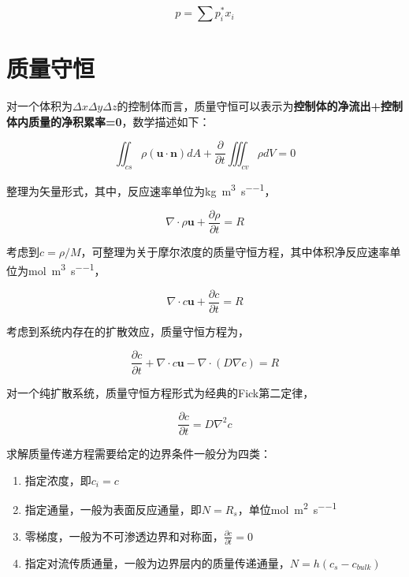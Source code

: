 \begin{equation}
p = \sum p_i^* x_i
\end{equation}


\section{质量守恒}

对一个体积为$ \Delta x \Delta y \Delta z $的控制体而言，质量守恒可以表示为\textbf{控制体的净流出+控制体内质量的净积累率=0}，数学描述如下：

\begin{equation}
\iint_{cs} \rho(\bm{u\cdot n})dA + \frac{\partial }{\partial t} \iiint_{cv}\rho dV = 0
\end{equation}

整理为矢量形式，其中，反应速率单位为\si{\kg\per\meter\cubed\per\second}，

\begin{equation}
\nabla \cdot \rho\mathbf{u} + \frac{\partial \rho}{\partial t} = R
\end{equation}

考虑到$ c=\rho/M $，可整理为关于摩尔浓度的质量守恒方程，其中体积净反应速率单位为\si{\mole\per\meter\cubed\per\second}，

\begin{equation}
\nabla \cdot c\mathbf{u} + \frac{\partial c}{\partial t} = R
\end{equation}

考虑到系统内存在的扩散效应，质量守恒方程为，

\begin{equation}
\frac{\partial c}{\partial t} + \nabla \cdot c\mathbf{u} - \nabla\cdot(D\nabla c) = R
\end{equation}

对一个纯扩散系统，质量守恒方程形式为经典的Fick第二定律，

\begin{equation}
\frac{\partial c}{\partial t} = D\nabla^2 c
\end{equation}

求解质量传递方程需要给定的边界条件一般分为四类：

\begin{enumerate}
\item 指定浓度，即$ c_i = c $
\item 指定通量，一般为表面反应通量，即$ N=R_s $，单位\si{\mole\per\meter\squared\per\second}
\item 零梯度，一般为不可渗透边界和对称面，$ \frac{\partial c}{\partial t}=0 $
\item 指定对流传质通量，一般为边界层内的质量传递通量，$ N=h(c_s-c_{bulk} ) $
\end{enumerate}

